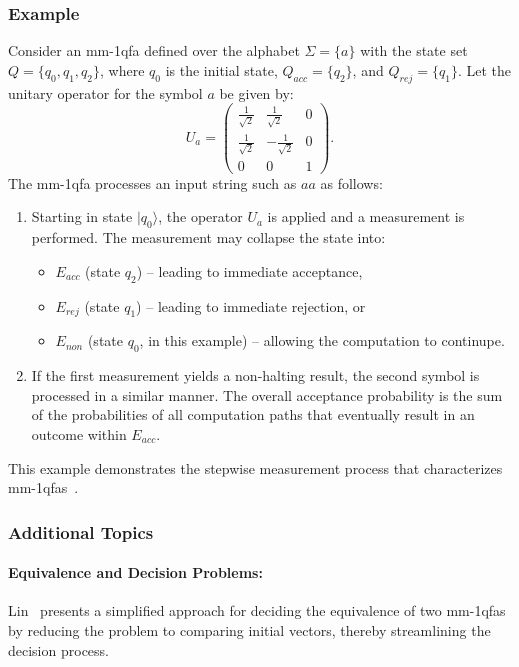 \subsubsection{Example}
Consider an \gls{mm-1qfa} defined over the alphabet $\Sigma=\{a\}$ with the state set $Q=\{q_0,q_1,q_2\}$, where $q_0$ is the initial state, $Q_{acc}=\{q_2\}$, and $Q_{rej}=\{q_1\}$. Let the unitary operator for the symbol $a$ be given by:
\[
U_a = \begin{pmatrix}
\frac{1}{\sqrt{2}} & \frac{1}{\sqrt{2}} & 0 \\[1mm]
\frac{1}{\sqrt{2}} & -\frac{1}{\sqrt{2}} & 0 \\[1mm]
0 & 0 & 1
\end{pmatrix}.
\]
The \gls{mm-1qfa} processes an input string such as $aa$ as follows:
\begin{enumerate}
    \item Starting in state $|q_0\rangle$, the operator $U_a$ is applied and a measurement is performed. The measurement may collapse the state into:
    \begin{itemize}
        \item $E_{acc}$ (state $q_2$) – leading to immediate acceptance,
        \item $E_{rej}$ (state $q_1$) – leading to immediate rejection, or
        \item $E_{non}$ (state $q_0$, in this example) – allowing the computation to continupe.
    \end{itemize}
    \item If the first measurement yields a non-halting result, the second symbol is processed in a similar manner. The overall acceptance probability is the sum of the probabilities of all computation paths that eventually result in an outcome within $E_{acc}$.
\end{enumerate}
This example demonstrates the stepwise measurement process that characterizes \glspl{mm-1qfa}~\cite{kondacs1997power,lin2012another}.

\subsubsection{Additional Topics}
\paragraph{Equivalence and Decision Problems:} Lin~\cite{lin2012another} presents a simplified approach for deciding the equivalence of two \glspl{mm-1qfa} by reducing the problem to comparing initial vectors, thereby streamlining the decision process.

